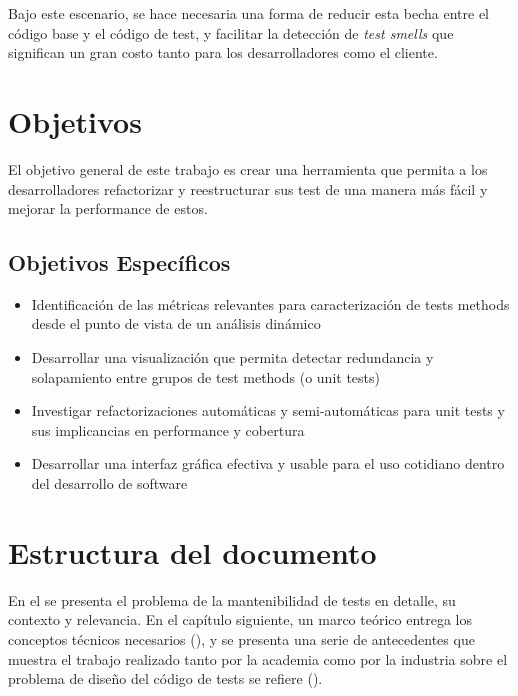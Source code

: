 \par Bajo este escenario, se hace necesaria una forma de reducir esta becha entre el código base y el código de test, y facilitar la detección de \emph{test smells} que significan un gran costo tanto para los desarrolladores como el cliente.


\newpage
\section{Objetivos}
\par El objetivo general de este trabajo es crear una herramienta que permita a los desarrolladores refactorizar y reestructurar sus test de una manera más fácil y mejorar la performance de estos.

\subsection*{Objetivos Específicos}
\begin{itemize}
\item Identificación de las métricas relevantes para caracterización de tests methods desde el punto de vista de un análisis dinámico
\item Desarrollar una visualización que permita detectar redundancia y solapamiento entre grupos de test methods (o unit tests)
\item Investigar refactorizaciones automáticas y semi-automáticas para unit tests y sus implicancias en performance y cobertura
\item Desarrollar una interfaz gráfica efectiva y usable para el uso cotidiano dentro del desarrollo de software
\end{itemize}

\section{Estructura del documento}

\par En el  se presenta el problema de la mantenibilidad de tests en detalle, su contexto y relevancia. En el capítulo siguiente, un marco teórico entrega los conceptos técnicos necesarios (), y se presenta una serie de antecedentes que muestra el trabajo realizado tanto por la academia como por la industria sobre el problema de diseño del código de tests se refiere (). 

